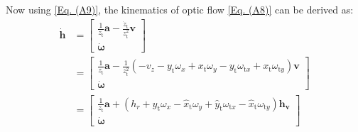 \documentclass[lettersize,journal]{IEEEtran}
\begin{document}

Now using \eqref{Eq. (A9)}, the kinematics of optic flow \eqref{Eq. (A8)} can be derived as:
\begin{align} \label{Eq. (A15)}
    \dot{\boldsymbol{h}} &= 
    \begin{bmatrix}
        \frac{1}{z_{\text{t}}} \boldsymbol{a} - \frac{\dot{z}_{\text{t}}}{z_{\text{t}}^2} \boldsymbol{v} \\ \dot{\boldsymbol{\omega}}
    \end{bmatrix} \nonumber \\
    &= \begin{bmatrix} 
        \frac{1}{z_{\text{t}}} \boldsymbol{a} - \frac{1}{z_{\text{t}}^2} \left( - v_{z} - y_{\text{t}} \omega_{x} + x_{\text{t}} \omega_{y} - y_{\text{t}} \omega_{\text{t}x} + x_{\text{t}} \omega_{\text{t}y} \right) \boldsymbol{v} \\ \dot{\boldsymbol{\omega}}
    \end{bmatrix} \nonumber \\
    &= \begin{bmatrix}
        \frac{1}{z_{\text{t}}}\boldsymbol{a} + \left( h_r + \hat{y}_{\text{t}} \omega_{x} - \hat{x}_{\text{t}} \omega_{y} + \hat{y}_{\text{t}} \omega_{\text{t}x} - \hat{x}_{\text{t}} \omega_{\text{t}y} \right) \boldsymbol{h}_{\boldsymbol{v}} \\ \dot{\boldsymbol{\omega}}
    \end{bmatrix}
\end{align}
\end{document}
